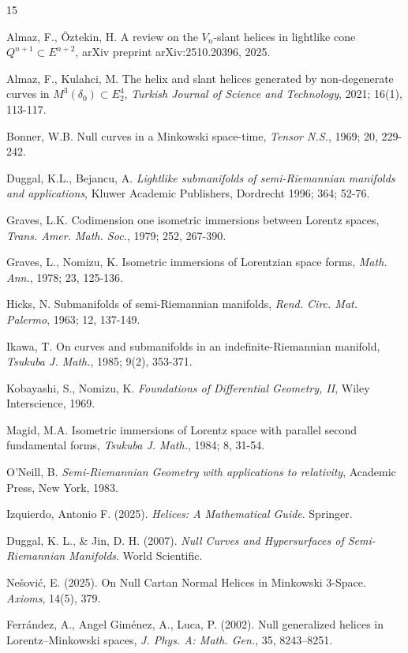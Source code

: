 \documentclass [reqno]{amsart}
\theoremstyle{plain}
\numberwithin{equation}{section}
\begin{document}
\begin{thebibliography}{15}

Almaz, F., Öztekin, H. A review on the $V_n$-slant helices in lightlike cone $Q^{n+1} \subset E^{n+2}$, arXiv preprint arXiv:2510.20396, 2025.

Almaz, F., Kulahci, M. The helix and slant helices generated by non-degenerate curves in $M^3 (\delta_0 ) \subset E_2^4$, \emph{Turkish Journal of Science and Technology}, 2021; 16(1), 113-117.

Bonner, W.B. Null curves in a Minkowski space-time, \emph{Tensor N.S.}, 1969; 20, 229-242.

Duggal, K.L., Bejancu, A. \emph{Lightlike submanifolds of semi-Riemannian manifolds and applications}, Kluwer Academic Publishers, Dordrecht 1996; 364; 52-76.

Graves, L.K. Codimension one isometric immersions between Lorentz spaces, \emph{Trans. Amer. Math. Soc.}, 1979; 252, 267-390.

Graves, L., Nomizu, K. Isometric immersions of Lorentzian space forms, \emph{Math. Ann.}, 1978; 23, 125-136.

Hicks, N. Submanifolds of semi-Riemannian manifolds, \emph{Rend. Circ. Mat. Palermo}, 1963; 12, 137-149.

Ikawa, T. On curves and submanifolds in an indefinite-Riemannian manifold, \emph{Tsukuba J. Math.}, 1985; 9(2), 353-371.

Kobayashi, S., Nomizu, K. \emph{Foundations of Differential Geometry, II}, Wiley Interscience, 1969.

Magid, M.A. Isometric immersions of Lorentz space with parallel second fundamental forms, \emph{Tsukuba J. Math.}, 1984; 8, 31-54.

O'Neill, B. \emph{Semi-Riemannian Geometry with applications to relativity}, Academic Press, New York, 1983.

Izquierdo, Antonio F. (2025). \emph{Helices: A Mathematical Guide}. Springer.

Duggal, K. L., \& Jin, D. H. (2007). \emph{Null Curves and Hypersurfaces of Semi-Riemannian Manifolds}. World Scientific.

Nešović, E. (2025). On Null Cartan Normal Helices in Minkowski 3-Space. \emph{Axioms}, 14(5), 379.

Ferrández, A., Angel Giménez, A., Luca, P. (2002). Null generalized helices in Lorentz–Minkowski spaces, \emph{J. Phys. A: Math. Gen.}, 35, 8243–8251.


\end{thebibliography}
\end{document}

